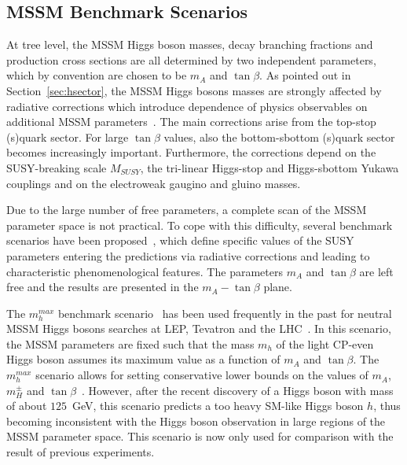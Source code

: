 \subsection{MSSM Benchmark Scenarios} \label{sec:benchmark}
At tree level, the MSSM  Higgs boson masses, decay branching fractions and production cross sections are all determined by two independent parameters,
which by convention are chosen to be $m_A$ and $\tan\beta$. As pointed out in Section~\ref{sec:hsector}, 
the MSSM Higgs bosons masses are strongly affected by radiative corrections which introduce dependence  of physics observables 
on additional MSSM parameters~\cite{Higgsm5}.
The main corrections arise from the top-stop (s)quark sector. For large $\tan\beta$ values, also the bottom-sbottom (s)quark sector becomes increasingly 
important. Furthermore, the corrections  depend on the SUSY-breaking scale $M_{SUSY}$, the tri-linear Higgs-stop and  
Higgs-sbottom Yukawa couplings and on the electroweak gaugino and gluino masses.

Due to the large number of free parameters, a complete scan of the MSSM parameter space is not practical. 
To cope with this difficulty, several benchmark scenarios have been proposed~\cite{LHCxsec,mhmax2}, which define 
specific values of the SUSY parameters entering the predictions via radiative corrections
and leading to characteristic phenomenological features.
The parameters $m_A$ and $\tan\beta$ are left free and the results are presented in the $m_A-\tan\beta$ plane.

The $m_h^{max}$ benchmark scenario~\cite{MSSMmhmax} has been used  frequently  in the past for neutral MSSM Higgs bosons searches
at LEP, Tevatron and the LHC~\cite{LEPLimits,TevatronLimits1,CMSLimit,ATLASLimit}. In this 
scenario, the MSSM parameters  are fixed such that the mass  $m_h$ of the light CP-even Higgs boson
assumes its maximum value as a function of $m_A$ and $\tan\beta$. The $m_h^{max}$ scenario allows for setting conservative 
lower bounds on the values of $m_A$, $m_H^{\pm}$ and $\tan\beta$~\cite{mhmax2}. However, after the recent discovery of a Higgs
boson with mass of about $125$~GeV, this scenario predicts a too heavy SM-like Higgs boson $h$, 
thus becoming inconsistent with the Higgs boson observation in large regions of the MSSM parameter space.
This scenario is now only  used  for  comparison with the result of previous experiments.


